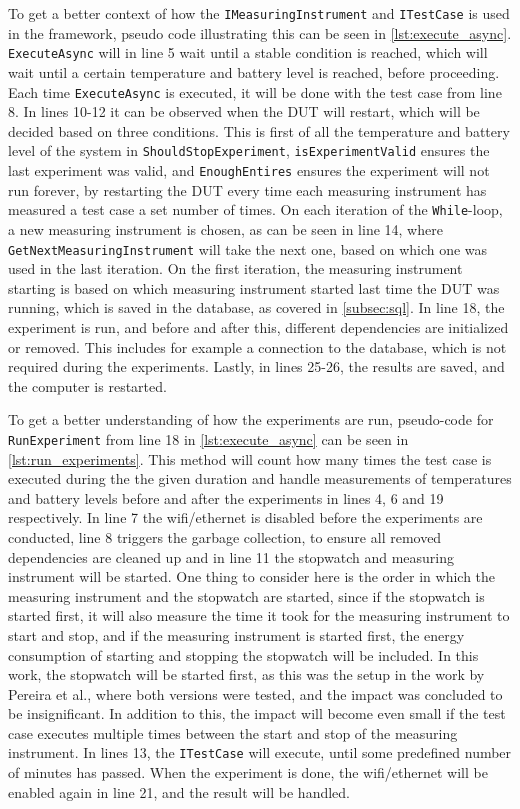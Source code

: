 To get a better context of how the \texttt{IMeasuringInstrument} and \texttt{ITestCase} is used in the framework, pseudo code illustrating this can be seen in \cref{lst:execute_async}. \texttt{ExecuteAsync} will in line 5 wait until a stable condition is reached, which will wait until a certain temperature and battery level is reached, before proceeding. Each time \texttt{ExecuteAsync} is executed, it will be done with the test case from line 8. In lines 10-12 it can be observed when the DUT will restart, which will be decided based on three conditions. This is first of all the temperature and battery level of the system in \texttt{ShouldStopExperiment}, \texttt{isExperimentValid} ensures the last experiment was valid, and \texttt{EnoughEntires} ensures the experiment will not run forever, by restarting the DUT every time each measuring instrument has measured a test case a set number of times. On each iteration of the \texttt{While}-loop, a new measuring instrument is chosen, as can be seen in line 14, where \texttt{GetNextMeasuringInstrument} will take the next one, based on which one was used in the last iteration. On the first iteration, the measuring instrument starting is based on which measuring instrument started last time the DUT was running, which is saved in the database, as covered in \cref{subsec:sql}. In line 18, the experiment is run, and before and after this, different dependencies are initialized or removed. This includes for example a connection to the database, which is not required during the experiments. Lastly, in lines 25-26, the results are saved, and the computer is restarted. 



To get a better understanding of how the experiments are run, pseudo-code for \texttt{RunExperiment} from line 18 in \cref{lst:execute_async} can be seen in \cref{lst:run_experiments}. This method will count how many times the test case is executed during the the given duration and handle measurements of temperatures and battery levels before and after the experiments in lines 4, 6 and 19 respectively. In line 7 the wifi/ethernet is disabled before the experiments are conducted, line 8 triggers the garbage collection, to ensure all removed dependencies are cleaned up and in line 11 the stopwatch and measuring instrument will be started. One thing to consider here is the order in which the measuring instrument and the stopwatch are started, since if the stopwatch is started first, it will also measure the time it took for the measuring instrument to start and stop, and if the measuring instrument is started first, the energy consumption of starting and stopping the stopwatch will be included. In this work, the stopwatch will be started first, as this was the setup in the work by Pereira et al.\cite[]{Pereira2017}, where both versions were tested, and the impact was concluded to be insignificant. In addition to this, the impact will become even small if the test case executes multiple times between the start and stop of the measuring instrument. In lines 13, the \texttt{ITestCase} will execute, until some predefined number of minutes has passed. When the experiment is done, the wifi/ethernet will be enabled again in line 21, and the result will be handled.





